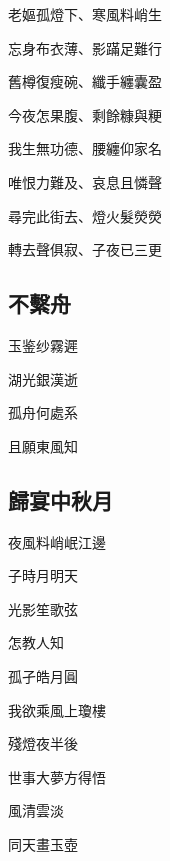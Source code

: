 \documentclass[a4j,12pt]{ltjtarticle}
\begin{document}
\begin{center}
		\vfill
		\LARGE 	老嫗孤燈下、寒風料峭生 \par
		忘身布衣薄、影蹣足難行 \par
		舊樽復瘦碗、纖手纏囊盈\par
		今夜怎果腹、剩餘糠與粳\par
		我生無功德、腰纏仰家名\par
		唯恨力難及、哀息且憐聲\par
		尋完此街去、燈火髮熒熒\par
		轉去聲俱寂、子夜已三更\par
		\vspace{1.5cm} %
		\vfill
		
		
	\newpage
	
		\begin{flushleft}
			\section{不繫舟} 
		\end{flushleft}
		
		\vfill
		\LARGE 	玉鉴纱霧遲\par
		湖光銀漢逝 \par
		孤舟何處系 \par
		且願東風知 \par
		\vspace{1.5cm} %
		\vfill
	
	\newpage
	
	\begin{flushleft}
		\section{歸宴中秋月} 
	\end{flushleft}
	
	\vfill
		\LARGE 	夜風料峭岷江邊\par
		子時月明天\par
		光影笙歌弦\par 怎教人知\par
		孤孑皓月圓\par
		我欲乘風上瓊樓\par
		殘燈夜半後\par
		世事大夢方得悟\par 風清雲淡\par
		同天畫玉壺\par
		\vspace{1.5cm} %
	\vfill
		
	
	\newpage
	

\end{center}
\end{document}
